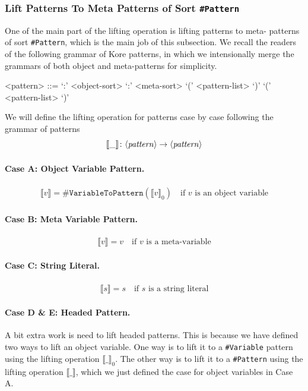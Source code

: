 \documentclass[UTF8,11pt]{article}
\theoremstyle{plain}
\theoremstyle{definition}
\theoremstyle{remark}
\newcommand{\denote}[1]{\llbracket{#1}\rrbracket}
\newcommand{\sharpsymbol}{\#}
\newcommand{\KVariable}{\texttt{\sharpsymbol Variable}}
\newcommand{\KVariableToKPattern}{\texttt{\sharpsymbol VariableToPattern}}
\newcommand{\KPattern}{\texttt{\sharpsymbol Pattern}}
\newcommand{\syntacc}[1]{\text{$\langle$\textit{#1}$\rangle$}}
\begin{document}
\subsubsection{Lift Patterns To Meta Patterns of Sort \KPattern}
One of the main part of the lifting operation is lifting patterns to meta-
patterns of sort \KPattern, which is the main job of this subsection.
We recall the readers of the following grammar of Kore 
patterns, in which we intensionally merge the grammars of both object and 
meta-patterns for simplicity.
\begin{grammar}
	<pattern> ::= \quad
	\alt <object-identifier> `:' <object-sort>
	\alt <meta-identifier> `:' <meta-sort>
	\alt <string-literal>
	\alt <object-head> `(' <pattern-list> `)'
	\alt <meta-head> `(' <pattern-list> `)'
\end{grammar}
We will define the lifting operation for patterns case by case following the 
grammar of patterns
\begin{equation*}
\denote{\_} \colon \syntacc{pattern} \to \syntacc{pattern}
\end{equation*}

\paragraph{Case A: Object Variable Pattern.}\quad
\begin{align*}
\denote{v} = \KVariableToKPattern(\denote{v}_0)\quad \text{if $v$ is an object 
variable}
\end{align*}

\paragraph{Case B: Meta Variable Pattern.} \quad
\begin{align*}
\denote{v} = v \quad \text{if $v$ is a meta-variable}
\end{align*}

\paragraph{Case C: String Literal.}\quad
\begin{align*}
\denote{s} = s \quad \text{if $s$ is a string literal}
\end{align*}

\paragraph{Case D \& E: Headed Pattern.} 
A bit extra work is need to lift headed patterns.
This is because we have defined two ways to lift an object variable.
One way is to lift it to a {\KVariable} pattern using the lifting operation 
$\denote{\_}_0$.
The other way is to lift it to a {\KPattern} using the lifting operation 
$\denote{\_}$, which we just defined the case for object variables in {Case A}.
\end{document}
